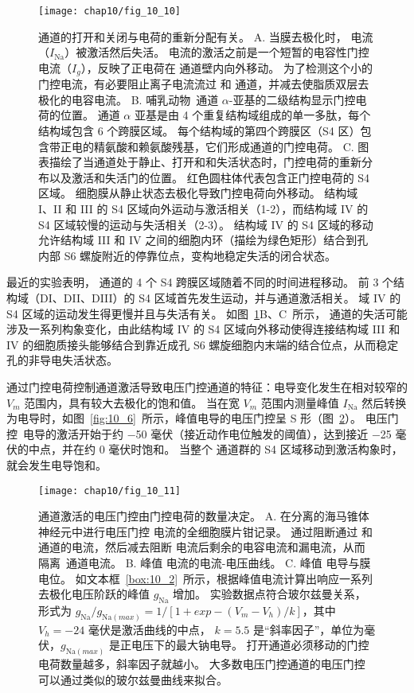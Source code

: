 \begin{figure}[htbp]
	\centering
	\texttt{[image: chap10/fig\_10\_10]}
	\caption{通道的打开和关闭与电荷的重新分配有关。
		A. 当膜去极化时， 电流（$I_\text{Na}$）被激活然后失活。
		 电流的激活之前是一个短暂的电容性门控电流（$I_g$），反映了正电荷在  通道壁内向外移动。
		为了检测这个小的门控电流，有必要阻止离子电流流过  和  通道，并减去使脂质双层去极化的电容电流\cite{armstrong1979fast}。
		B. 哺乳动物~通道 $\alpha$-亚基的二级结构显示门控电荷的位置。
		通道 $\alpha$ 亚基是由 4 个重复结构域组成的单一多肽，每个结构域包含 6 个跨膜区域。
		每个结构域的第四个跨膜区（S4 区）包含带正电的精氨酸和赖氨酸残基，它们形成通道的门控电荷\cite{ahern2016hitchhiker}。
		C. 图表描绘了当通道处于静止、打开和和失活状态时，门控电荷的重新分布以及激活和失活门的位置。
		红色圆柱体代表包含正门控电荷的 S4 区域。
		细胞膜从静止状态去极化导致门控电荷向外移动。
		结构域 I、II 和 III 的 S4 区域向外运动与激活相关（1-2），而结构域 IV 的 S4 区域较慢的运动与失活相关（2-3）。
		结构域 IV 的 S4 区域的移动允许结构域 III 和 IV 之间的细胞内环（描绘为绿色矩形）结合到孔内部 S6 螺旋附近的停靠位点，变构地稳定失活的闭合状态\cite{ahern2016hitchhiker}。}
	\label{fig:10_10}
\end{figure}



最近的实验表明， 通道的 4 个 S4 跨膜区域随着不同的时间进程移动。
前 3 个结构域（DI、DII、DIII）的 S4 区域首先发生运动，并与通道激活相关。
域 IV 的 S4 区域的运动发生得更慢并且与失活有关。 
如图~\ref{fig:10_10}B、C~所示， 通道的失活可能涉及一系列构象变化，由此结构域 IV 的 S4 区域向外移动使得连接结构域 III 和 IV 的细胞质接头能够结合到靠近成孔 S6 螺旋细胞内末端的结合位点，从而稳定孔的非导电失活状态。


通过门控电荷控制通道激活导致电压门控通道的特征：电导变化发生在相对较窄的 $V_m$ 范围内，具有较大去极化的饱和值。
当在宽 $V_m$ 范围内测量峰值 $I_\text{Na}$ 然后转换为电导时，如图~\ref{fig:10_6}~所示，峰值电导的电压门控呈 S 形（图~\ref{fig:10_11}）。
电压门控~电导的激活开始于约 −50 毫伏（接近动作电位触发的阈值），达到接近 −25 毫伏的中点，并在约 0 毫伏时饱和。 
当整个  通道群的 S4 区域移动到激活构象时，就会发生电导饱和。


\begin{figure}[htbp]
	\centering
	\texttt{[image: chap10/fig\_10\_11]}
	\caption{通道激活的电压门控由门控电荷的数量决定。
		A. 在分离的海马锥体神经元中进行电压门控  电流的全细胞膜片钳记录。
		通过阻断通过  和通道的电流，然后减去阻断  电流后剩余的电容电流和漏电流，从而隔离~通道电流。
		B. 峰值  电流的电流-电压曲线。
		C. 峰值  电导与膜电位。 
		如文本框~\ref{box:10_2}~所示，根据峰值电流计算出响应一系列去极化电压阶跃的峰值 $g_\text{Na}$ 增加。
		实验数据点符合玻尔兹曼关系，形式为 $g_\text{Na} / g_{\text{Na}(max)} = 1 / [1 + exp - (V_m - V_h) / k]$，其中 $V_h = −24$ 毫伏是激活曲线的中点， $k = 5.5$ 是“斜率因子”，单位为毫伏，$g_{\text{Na} (max)}$ 是正电压下的最大钠电导。
		打开通道必须移动的门控电荷数量越多，斜率因子就越小。
		大多数电压门控通道的电压门控可以通过类似的玻尔兹曼曲线来拟合。}
	\label{fig:10_11}
\end{figure}


